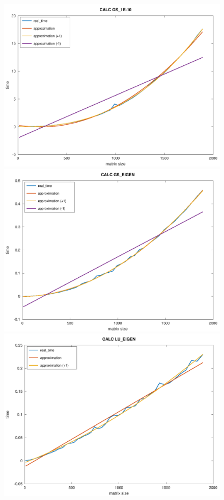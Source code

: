 \documentclass[10pt]{article}
\begin{document}
\begin{figure}[h]
	\centering
	\includegraphics[scale=0.3]{plots/11_calc_gauss_1e10_plus_minus_time.png}
	\includegraphics[scale=0.3]{plots/13_calc_gauss_eigen_plus_minus_time.png}
	\includegraphics[scale=0.3]{plots/15_calc_lu_eigen_plus_minus_time.png}
\end{figure}
\end{document}
